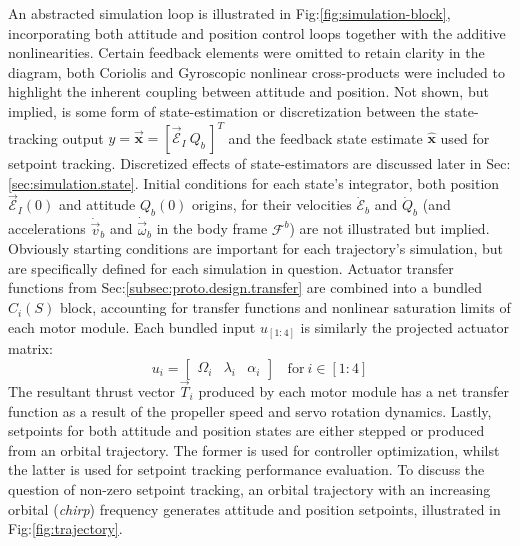 \par
An abstracted simulation loop is illustrated in Fig:\ref{fig:simulation-block}, incorporating both attitude and position control loops together with the additive nonlinearities. Certain feedback elements were omitted to retain clarity in the diagram, both Coriolis and Gyroscopic nonlinear cross-products were included to highlight the inherent coupling between attitude and position. Not shown, but implied, is some form of state-estimation or discretization between the state-tracking output $y=\vec{\mathbf{x}}=[\vec{\mathcal{E}}_I~Q_b\hspace{2pt}]^T$ and the feedback state estimate $\hat{\mathbf{x}}$ used for setpoint tracking. Discretized effects of state-estimators are discussed later in Sec:\ref{sec:simulation.state}. Initial conditions for each state's integrator, both position $\vec{\mathcal{E}}_I(0)$ and attitude $Q_b(0)$ origins, for their velocities $\dot{\mathcal{E}}_b$ and $\dot{Q}_b$ (and accelerations $\dot{\vec{v}}_b$ and $\dot{\vec{\omega}}_b$ in the body frame $\mathcal{F}^b$) are not illustrated but implied. Obviously starting conditions are important for each trajectory's simulation, but are specifically defined for each simulation in question. Actuator transfer functions from Sec:\ref{subsec:proto.design.transfer} are combined into a bundled $C_{i}(S)$ block, accounting for transfer functions and nonlinear saturation limits of each motor module. Each bundled input $u_{[1:4]}$ is similarly the projected actuator matrix:
\begin{equation}
u_i = \begin{bmatrix}
\Omega_i & \lambda_i & \alpha_i
\end{bmatrix}~~~~\text{for}~i\in[1:4]
\end{equation}
The resultant thrust vector $\vec{T}_i$ produced by each motor module has a net transfer function as a result of the propeller speed and servo rotation dynamics. Lastly, setpoints for both attitude and position states are either stepped or produced from an orbital trajectory. The former is used for controller optimization, whilst the latter is used for setpoint tracking performance evaluation. To discuss the question of non-zero setpoint tracking, an orbital trajectory with an increasing orbital (\emph{chirp}) frequency generates attitude and position setpoints, illustrated in Fig:\ref{fig:trajectory}.
